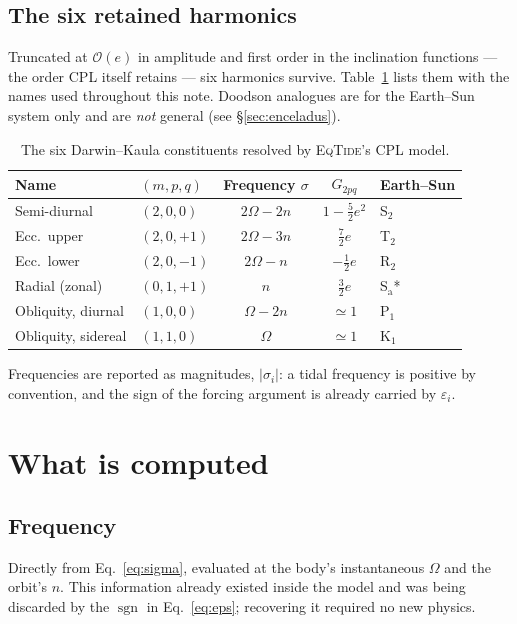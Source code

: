 \documentclass[11pt]{article}
\newcommand{\eqtide}{\textsc{EqTide}}
\newcommand{\Om}{\Omega}
\begin{document}
\subsection{The six retained harmonics}

Truncated at $\mathcal{O}(e)$ in amplitude and first order in the inclination
functions --- the order CPL itself retains --- six harmonics survive.
Table~\ref{tab:constituents} lists them with the names used throughout this
note. Doodson analogues are for the Earth--Sun system only and are \emph{not}
general (see \S\ref{sec:enceladus}).

\begin{table}[h]
\centering
\caption{The six Darwin--Kaula constituents resolved by \eqtide's CPL model.}
\label{tab:constituents}
\begin{tabular}{llccl}
\toprule
Name & $(m,p,q)$ & Frequency $\sigma$ & $G_{2pq}$ & Earth--Sun \\
\midrule
Semi-diurnal        & $(2,0,0)$  & $2\Om-2n$ & $1-\tfrac52 e^2$ & S$_2$ \\
Ecc.\ upper         & $(2,0,+1)$ & $2\Om-3n$ & $\tfrac72 e$     & T$_2$ \\
Ecc.\ lower         & $(2,0,-1)$ & $2\Om-n$  & $-\tfrac12 e$    & R$_2$ \\
Radial (zonal)      & $(0,1,+1)$ & $n$       & $\tfrac32 e$     & S$_\mathrm{a}$* \\
Obliquity, diurnal  & $(1,0,0)$  & $\Om-2n$  & $\simeq 1$       & P$_1$ \\
Obliquity, sidereal & $(1,1,0)$  & $\Om$     & $\simeq 1$       & K$_1$ \\
\bottomrule
\end{tabular}
\end{table}

Frequencies are reported as magnitudes, $|\sigma_i|$: a tidal frequency is
positive by convention, and the sign of the forcing argument is already
carried by $\varepsilon_i$.

\section{What is computed}

\subsection{Frequency}

Directly from Eq.~\eqref{eq:sigma}, evaluated at the body's instantaneous
$\Om$ and the orbit's $n$. This information already existed inside the model
and was being discarded by the $\operatorname{sgn}$ in Eq.~\eqref{eq:eps};
recovering it required no new physics.
\end{document}
